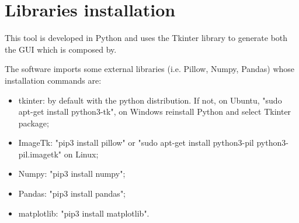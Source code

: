\documentclass[fleqn,10pt]{SelfArx} %
\begin{document}
	\twocolumn
	\section{Libraries installation}
    	This tool is developed in Python and uses the Tkinter library to generate both the GUI which is composed by.

        The software imports some external libraries (i.e. Pillow, Numpy, Pandas) whose installation commands are:
        \begin{itemize}
            \item tkinter: by default with the python distribution. If not, on Ubuntu, "sudo apt-get install python3-tk", on Windows reinstall Python and select Tkinter package;
            \item ImageTk: "pip3 install pillow" or "sudo apt-get install python3-pil python3-pil.imagetk" on Linux;
            \item Numpy: "pip3 install numpy";
            \item Pandas: "pip3 install pandas";
            \item matplotlib: "pip3 install matplotlib".
        \end{itemize}

\newpage




\end{document}
